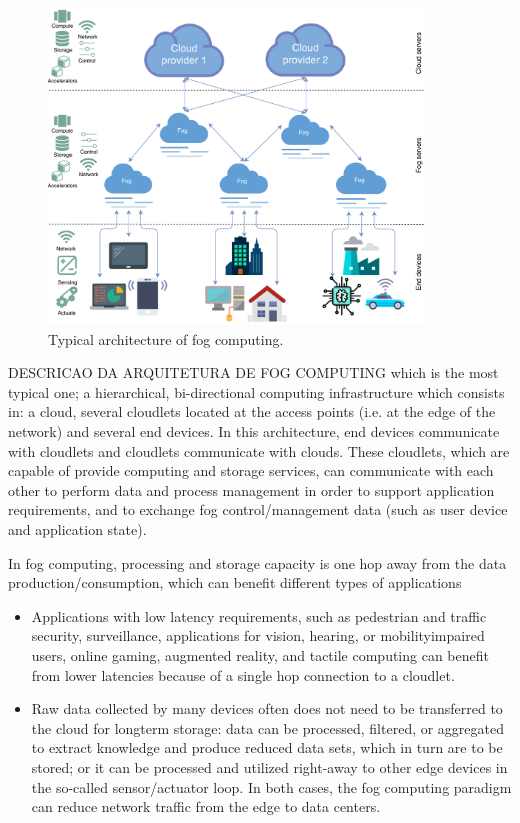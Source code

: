 
\begin{figure}
	\centering
	\includegraphics[width=100mm]{images/fog_architecture/fog_architecture}
	\caption{Typical architecture of fog computing.}
	\label{fog_architecture}
\end{figure}

DESCRICAO DA ARQUITETURA DE FOG COMPUTING
which is the most typical one; a hierarchical, bi-directional computing infrastructure which consists in: a cloud, several cloudlets located at the access points (i.e. at the edge of the network) and several end devices. In this architecture, end devices communicate with cloudlets and cloudlets communicate with clouds. These cloudlets, which are capable of provide computing and storage services, can communicate with each other to perform data and process management in order to support application requirements, and to exchange fog control/management data (such as user device and application state).

In fog computing, processing and storage capacity is one hop away from the data production/consumption, which can benefit different types of applications

\begin{itemize}
	\item Applications with low latency requirements, such as pedestrian and traffic security, surveillance, applications for vision, hearing, or mobilityimpaired users, online gaming, augmented reality, and tactile computing can benefit from lower latencies because of a single hop connection to a cloudlet.
	\item Raw data collected by many devices often does not need to be transferred to the cloud for longterm storage: data can be processed, filtered, or aggregated to extract knowledge and produce reduced data sets, which in turn are to be stored; or it can be processed and utilized right-away to other edge devices in the so-called sensor/actuator loop. In both cases, the fog computing paradigm can reduce network traffic from the edge to data centers.
\end{itemize}

